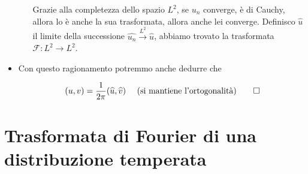 \begin{itemize}
\begin{itemize}
Grazie alla completezza dello spazio $L^{2}$, se $u_{n}$ converge, è di Cauchy, allora lo è anche la sua trasformata, allora anche lei converge. Definisco $\hat{u}$ il limite della successione $\widehat{u_{n}}\xrightarrow{L^{2}}\hat{u}$, abbiamo trovato la trasformata $\mathcal{F} :L^{2}\rightarrow L^{2}$.
\end{itemize}
\item Con questo ragionamento potremmo anche dedurre che

\begin{equation*}
( u,v) =\frac{1}{2\pi }(\hat{u} ,\hat{v}) \ \ \ \ \text{(si mantiene l'ortogonalità)}\qed 
\end{equation*}
\end{itemize}
\section{Trasformata di Fourier di una distribuzione temperata}

